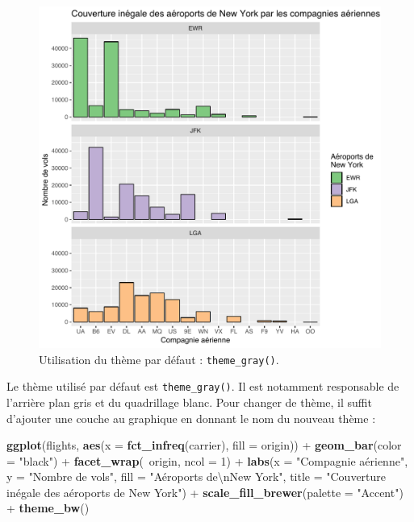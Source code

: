 \documentclass[
  a4paper,
]{article}
\newenvironment{Shaded}{\begin{snugshade}}{\end{snugshade}}
\newcommand{\CharTok}[1]{\textcolor[rgb]{0.57,0.30,0.62}{#1}}
\newcommand{\DataTypeTok}[1]{\textcolor[rgb]{0.00,0.34,0.68}{#1}}
\newcommand{\DecValTok}[1]{\textcolor[rgb]{0.69,0.50,0.00}{#1}}
\newcommand{\KeywordTok}[1]{\textcolor[rgb]{0.12,0.11,0.11}{\textbf{#1}}}
\newcommand{\NormalTok}[1]{\textcolor[rgb]{0.12,0.11,0.11}{#1}}
\newcommand{\OperatorTok}[1]{\textcolor[rgb]{0.12,0.11,0.11}{#1}}
\newcommand{\StringTok}[1]{\textcolor[rgb]{0.75,0.01,0.01}{#1}}
\begin{document}
\begin{figure}[htpb]

{\centering \includegraphics[width=0.9\linewidth]{figure/theme1-1} 

}

\caption{Utilisation du thème par défaut : \texttt{theme\_gray()}.}\label{fig:theme1}
\end{figure}



Le thème utilisé par défaut est \texttt{theme\_gray()}. Il est notamment responsable de l'arrière plan gris et du quadrillage blanc. Pour changer de thème, il suffit d'ajouter une couche au graphique en donnant le nom du nouveau thème :

\begin{Shaded}
\begin{Highlighting}[]
\KeywordTok{ggplot}\NormalTok{(flights, }\KeywordTok{aes}\NormalTok{(}\DataTypeTok{x =} \KeywordTok{fct_infreq}\NormalTok{(carrier), }\DataTypeTok{fill =}\NormalTok{ origin)) }\OperatorTok{+}
\StringTok{  }\KeywordTok{geom_bar}\NormalTok{(}\DataTypeTok{color =} \StringTok{"black"}\NormalTok{) }\OperatorTok{+}
\StringTok{  }\KeywordTok{facet_wrap}\NormalTok{(}\OperatorTok{~}\NormalTok{origin, }\DataTypeTok{ncol =} \DecValTok{1}\NormalTok{) }\OperatorTok{+}
\StringTok{  }\KeywordTok{labs}\NormalTok{(}\DataTypeTok{x =} \StringTok{"Compagnie aérienne"}\NormalTok{,}
       \DataTypeTok{y =} \StringTok{"Nombre de vols"}\NormalTok{,}
       \DataTypeTok{fill =} \StringTok{"Aéroports de}\CharTok{\textbackslash{}n}\StringTok{New York"}\NormalTok{,}
       \DataTypeTok{title =} \StringTok{"Couverture inégale des aéroports de New York"}\NormalTok{) }\OperatorTok{+}
\StringTok{  }\KeywordTok{scale_fill_brewer}\NormalTok{(}\DataTypeTok{palette =} \StringTok{"Accent"}\NormalTok{) }\OperatorTok{+}
\StringTok{  }\KeywordTok{theme_bw}\NormalTok{()}
\end{Highlighting}
\end{Shaded}
\end{document}
